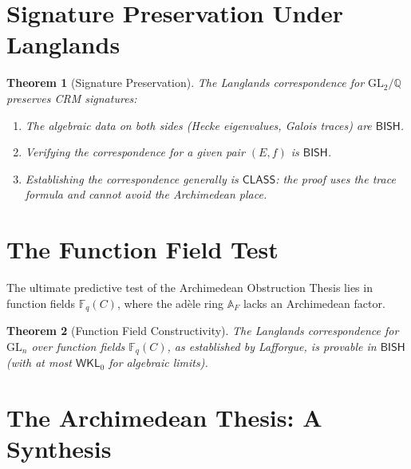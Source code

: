 \documentclass[11pt,a4paper]{article}
\theoremstyle{plain}
\newtheorem{theorem}{Theorem}[section]
\theoremstyle{definition}
\newcommand{\BISH}{\textsf{BISH}}
\newcommand{\WKL}{\textsf{WKL}_0}
\newcommand{\CLASS}{\textsf{CLASS}}
\newcommand{\Q}{\mathbb{Q}}
\newcommand{\F}{\mathbb{F}}
\newcommand{\A}{\mathbb{A}}
\newcommand{\GL}{\mathrm{GL}}
\begin{document}
\section{Signature Preservation Under Langlands}\label{sec:langlands}

\begin{theorem}[Signature Preservation]\label{thm:sig-preserve}
The Langlands correspondence for $\GL_2/\Q$ preserves CRM signatures:
\begin{enumerate}[label=(\roman*)]
\item The algebraic data on both sides (Hecke eigenvalues, Galois traces) are $\BISH$.
\item Verifying the correspondence for a given pair $(E, f)$ is $\BISH$.
\item Establishing the correspondence generally is $\CLASS$: the proof uses the trace formula and cannot avoid the Archimedean place.
\end{enumerate}
\end{theorem}


\section{The Function Field Test}\label{sec:function-fields}

The ultimate predictive test of the Archimedean Obstruction Thesis lies in function fields $\F_q(C)$, where the ad\`ele ring $\A_F$ lacks an Archimedean factor. 

\begin{theorem}[Function Field Constructivity]\label{thm:ff}
The Langlands correspondence for $\GL_n$ over function fields $\F_q(C)$, as established by Lafforgue, is provable in $\BISH$ (with at most $\WKL$ for algebraic limits).
\end{theorem}


\section{The Archimedean Thesis: A Synthesis}\label{sec:thesis}
\end{document}

